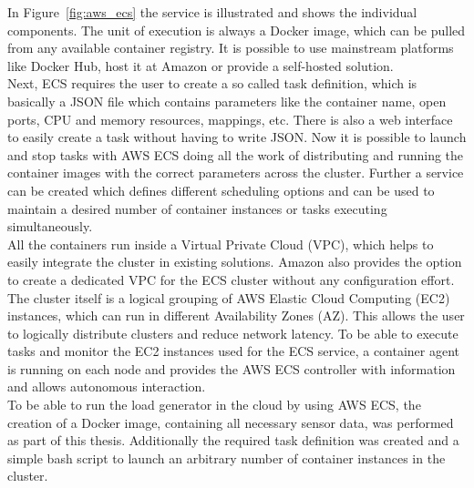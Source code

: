 In Figure~\ref{fig:aws_ecs} the service is illustrated and shows the individual components.
The unit of execution is always a Docker image, which can be pulled from any available container registry.
It is possible to use mainstream platforms like Docker Hub, host it at Amazon or provide a self-hosted solution.\\
Next, ECS requires the user to create a so called task definition, which is basically a JSON file which contains parameters like the container name, open ports, CPU and memory resources, mappings, etc.
There is also a web interface to easily create a task without having to write JSON.
Now it is possible to launch and stop tasks with AWS ECS doing all the work of distributing and running the container images with the correct parameters across the cluster.
Further a service can be created which defines different scheduling options and can be used to maintain a desired number of container instances or tasks executing simultaneously.\\

All the containers run inside a Virtual Private Cloud (VPC), which helps to easily integrate the cluster in existing solutions.
Amazon also provides the option to create a dedicated VPC for the ECS cluster without any configuration effort.
The cluster itself is a logical grouping of AWS Elastic Cloud Computing (EC2) instances, which can run in different Availability Zones (AZ).
This allows the user to logically distribute clusters and reduce network latency.
To be able to execute tasks and monitor the EC2 instances used for the ECS service, a container agent is running on each node and provides the AWS ECS controller with information and allows autonomous interaction.\\

To be able to run the load generator in the cloud by using AWS ECS, the creation of a Docker image, containing all necessary sensor data, was performed as part of this thesis.
Additionally the required task definition was created and a simple bash script to launch an arbitrary number of container instances in the cluster.


